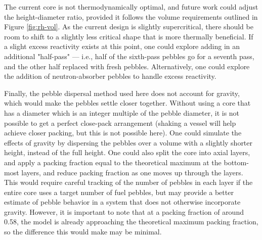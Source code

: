 The current core is not thermodynamically optimal, and future work could adjust the height-diameter ratio, provided it follows the volume requirements outlined in Figure \ref{fig:rh-vol}.  As the current design is slightly supercritical, there should be room to shift to a slightly less critical shape that is more thermally beneficial.  If a slight excess reactivity exists at this point, one could explore adding in an additional "half-pass" --- i.e., half of the sixth-pass pebbles go for a seventh pass, and the other half replaced with fresh pebbles.  Alternatively, one could explore the addition of neutron-absorber pebbles to handle excess reactivity.

Finally, the pebble dispersal method used here does not account for gravity, which would make the pebbles settle closer together.  Without using a core that has a diameter which is an integer multiple of the pebble diameter, it is not possible to get a perfect close-pack arrangement (shaking a vessel will help achieve closer packing, but this is not possible here).  One could simulate the effects of gravity by dispersing the pebbles over a volume with a slightly shorter height, instead of the full height.  One could also split the core into axial layers, and apply a packing fraction equal to the theoretical maximum at the bottom-most layers, and reduce packing fraction as one moves up through the layers.  This would require careful tracking of the number of pebbles in each layer if the entire core uses a target number of fuel pebbles, but may provide a better estimate of pebble behavior in a system that does not otherwise incorporate gravity.  However, it is important to note that at a packing fraction of around 0.58, the model is already approaching the theoretical maximum packing fraction, so the difference this would make may be minimal.